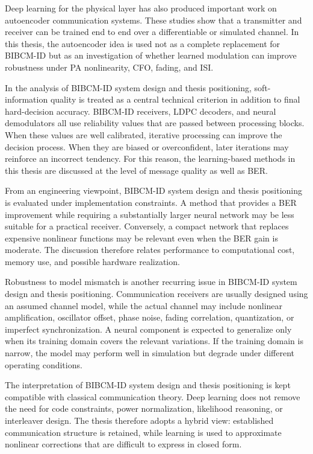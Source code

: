 Deep learning for the physical layer has also produced important work on autoencoder communication systems. These studies show that a transmitter and receiver can be trained end to end over a differentiable or simulated channel. In this thesis, the autoencoder idea is used not as a complete replacement for BIBCM-ID but as an investigation of whether learned modulation can improve robustness under PA nonlinearity, CFO, fading, and ISI.

In the analysis of BIBCM-ID system design and thesis positioning, soft-information quality is treated as a central technical criterion in addition to final hard-decision accuracy. BIBCM-ID receivers, LDPC decoders, and neural demodulators all use reliability values that are passed between processing blocks. When these values are well calibrated, iterative processing can improve the decision process. When they are biased or overconfident, later iterations may reinforce an incorrect tendency. For this reason, the learning-based methods in this thesis are discussed at the level of message quality as well as BER.

From an engineering viewpoint, BIBCM-ID system design and thesis positioning is evaluated under implementation constraints. A method that provides a BER improvement while requiring a substantially larger neural network may be less suitable for a practical receiver. Conversely, a compact network that replaces expensive nonlinear functions may be relevant even when the BER gain is moderate. The discussion therefore relates performance to computational cost, memory use, and possible hardware realization.

Robustness to model mismatch is another recurring issue in BIBCM-ID system design and thesis positioning. Communication receivers are usually designed using an assumed channel model, while the actual channel may include nonlinear amplification, oscillator offset, phase noise, fading correlation, quantization, or imperfect synchronization. A neural component is expected to generalize only when its training domain covers the relevant variations. If the training domain is narrow, the model may perform well in simulation but degrade under different operating conditions.

The interpretation of BIBCM-ID system design and thesis positioning is kept compatible with classical communication theory. Deep learning does not remove the need for code constraints, power normalization, likelihood reasoning, or interleaver design. The thesis therefore adopts a hybrid view: established communication structure is retained, while learning is used to approximate nonlinear corrections that are difficult to express in closed form.

